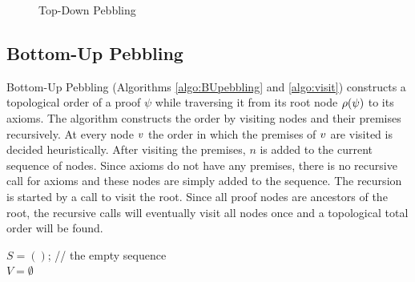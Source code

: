 \documentclass{llncs}
\newcommand{\nodedistance}{0.55cm}
\begin{document}
\begin{example}
\begin{figure}[h]
{\begin{minipage}{.33\textwidth}
	\end{minipage}%
	}
	\caption{Top-Down Pebbling}
	\label{fig:TDP}
\end{figure}
\label{example:TDPIssue}
\end{example}


\subsection{Bottom-Up Pebbling}

Bottom-Up Pebbling (Algorithms \ref{algo:BUpebbling} and \ref{algo:visit}) constructs a topological order of a proof $\psi$ while traversing it from its root node $\rho(\psi)$ to its axioms. The algorithm constructs the order by visiting nodes and their premises recursively. At every node $v$ the order in which the premises of $v$ are visited is decided heuristically. After visiting the premises, $n$ is added to the current sequence of nodes.
Since axioms do not have any premises, there is no recursive call for axioms and these nodes are simply added to the sequence. The recursion is started by a call to visit the root.
Since all proof nodes are ancestors of the root, the recursive calls will eventually visit all nodes once and a topological total order will be found.



\begin{algorithm}[h]
  \BlankLine

	$S = ()$; // the empty sequence \\
	$V = \emptyset$\;
	\Return {}\;

  \caption[.]{}
  \label{algo:BUpebbling}
\end{algorithm}
\end{document}
